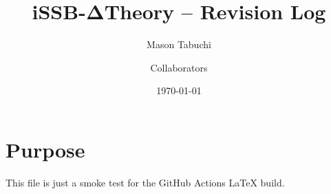 \documentclass{article}
\begin{document}
\title{iSSB-ΔTheory -- Revision Log}
\author{Mason Tabuchi \and Collaborators}
\date{\today}
\maketitle

\section*{Purpose}
This file is just a smoke test for the GitHub Actions LaTeX build.
\end{document}
